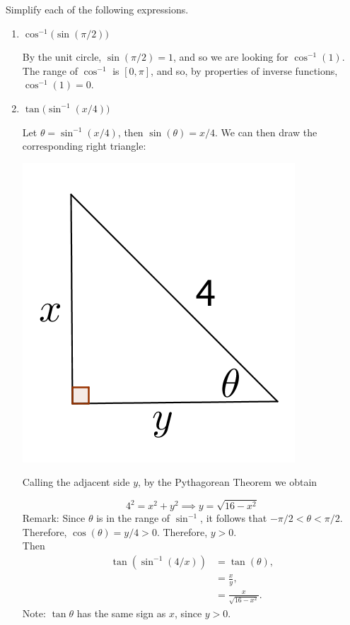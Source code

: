 \documentclass[nooutcomes,handout]{ximera}
\begin{document}
    \begin{problem}
  Simplify each of the following expressions.
  \begin{enumerate}
    \item
      $\cos^{-1} \bigl( \sin(\pi/2) \bigr)$
      \begin{freeResponse}
        By the unit circle, $\sin(\pi/2) = 1$, and so we are looking for $\cos^{-1}(1)$.
        The range of $\cos^{-1}$ is $[0, \pi]$, and so, by properties of inverse functions, $\cos^{-1}(1) = 0$.
      \end{freeResponse}

    \item
      $\tan \bigl( \sin^{-1}(x/4) \bigr)$
      \begin{freeResponse}
        Let $\theta = \sin^{-1}(x/4)$, then $\sin(\theta) = x/4$.
        We can then draw the corresponding right triangle:
        \begin{image}
          \includegraphics[scale = 0.4]{figure5.png}
        \end{image}
        Calling the adjacent side $y$, by the Pythagorean Theorem we obtain

          $$4^2 = x^2 + y^2 \implies y = \sqrt{16-x^2}$$
Remark: Since $\theta$ is in the range of $\sin^{-1}$, it follows that $-\pi /2 <\theta <\pi /2$.  Therefore, $\cos(\theta)=y/4>0$.  Therefore, $y>0$.\\
        Then
        \begin{align*}
          \tan \left( \sin^{-1} \left(4/x \right) \right) &= \tan( \theta), \\
                                                                   &= \frac{x}{y}, \\
                                                                 &= \frac{x}{\sqrt{16-x^2}}.
        \end{align*}
Note: $\tan\theta$ has the same sign as $x$, since $y>0$.
      \end{freeResponse}
  \end{enumerate}
\end{problem}  
\end{document}
